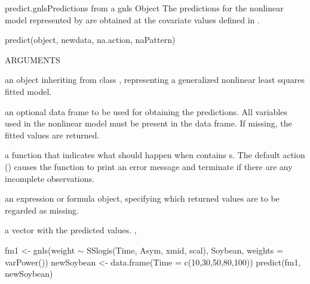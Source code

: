 \documentclass[pdftex]{article} \usepackage{url,graphicx}
\renewcommand{\Twiddle}{\mbox{\(\sim\)}}
\begin{document}
\begin{Helpfile}{predict.gnls}{Predictions from a gnls Object}
The predictions for the nonlinear model represented by  are
obtained at the covariate values defined in .
\begin{Example}
predict(object, newdata, na.action, naPattern)
\end{Example}
\begin{Argument}{ARGUMENTS}
\item[\Co{object:}]
an object inheriting from class , representing
a generalized nonlinear least squares fitted model.
\item[\Co{newdata:}]
an optional data frame to be used for obtaining the
predictions. All variables used in the nonlinear model must be present
in the data frame. If missing, the fitted values are returned.
\item[\Co{na.action:}]
a function that indicates what should happen when
 contains s.  The default action
() causes the function to print an error message and
terminate if there are any incomplete observations.
\item[\Co{naPattern:}]
an expression or formula object, specifying which returned
values are to be regarded as missing.
\end{Argument}
a vector with the predicted values.
, 
\need 15pt
\vspace{-16pt}
\begin{Example}
fm1 <- gnls(weight {\Twiddle} SSlogis(Time, Asym, xmid, scal), Soybean,
            weights = varPower())
newSoybean <- data.frame(Time = c(10,30,50,80,100))
predict(fm1, newSoybean)
\end{Example}
\end{Helpfile}
\end{document}

